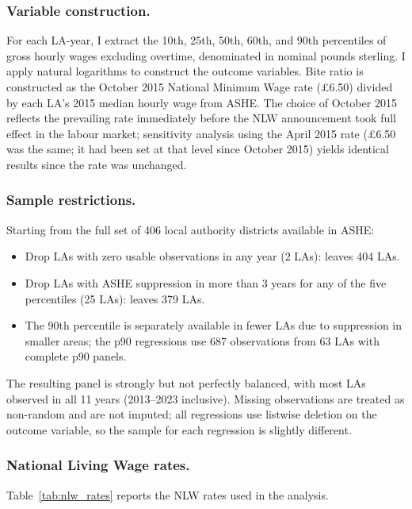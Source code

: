 \documentclass[12pt]{article}
\begin{document}
\subsubsection*{Variable construction.}
For each LA-year, I extract the 10th, 25th, 50th, 60th, and 90th percentiles of gross hourly wages excluding overtime, denominated in nominal pounds sterling. I apply natural logarithms to construct the outcome variables. Bite ratio is constructed as the October 2015 National Minimum Wage rate (\pounds6.50) divided by each LA's 2015 median hourly wage from ASHE. The choice of October 2015 reflects the prevailing rate immediately before the NLW announcement took full effect in the labour market; sensitivity analysis using the April 2015 rate (\pounds6.50 was the same; it had been set at that level since October 2015) yields identical results since the rate was unchanged.

\subsubsection*{Sample restrictions.}
Starting from the full set of 406 local authority districts available in ASHE:
\begin{itemize}
\item Drop LAs with zero usable observations in any year (2 LAs): leaves 404 LAs.
\item Drop LAs with ASHE suppression in more than 3 years for any of the five percentiles (25 LAs): leaves 379 LAs.
\item The 90th percentile is separately available in fewer LAs due to suppression in smaller areas; the p90 regressions use 687 observations from 63 LAs with complete p90 panels.
\end{itemize}
The resulting panel is strongly but not perfectly balanced, with most LAs observed in all 11 years (2013--2023 inclusive). Missing observations are treated as non-random and are not imputed; all regressions use listwise deletion on the outcome variable, so the sample for each regression is slightly different.

\subsubsection*{National Living Wage rates.}
Table~\ref{tab:nlw_rates} reports the NLW rates used in the analysis.
\end{document}
